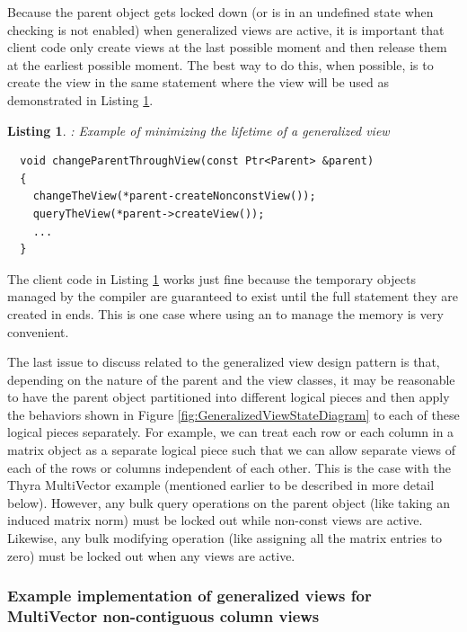 \documentclass[pdf,ps2pdf,11pt]{SANDreport}
\newtheorem{listing}{Listing}
\begin{document}
Because the parent object gets locked down (or is in an undefined
state when checking is not enabled) when generalized views are active,
it is important that client code only create views at the last
possible moment and then release them at the earliest possible moment.
The best way to do this, when possible, is to create the view in the
same statement where the view will be used as demonstrated in Listing
{}\ref{listing:generalized-view-min-lifetime}.


\begin{listing}:  Example of minimizing the lifetime of a generalized
view  \\
\label{listing:generalized-view-min-lifetime}
{\small\begin{verbatim}
  void changeParentThroughView(const Ptr<Parent> &parent)
  {
    changeTheView(*parent-createNonconstView());
    queryTheView(*parent->createView());
    ...
  }
\end{verbatim}}
\end{listing}


The client code in Listing
{}\ref{listing:generalized-view-min-lifetime} works just fine because
the temporary {} objects managed by the
compiler are guaranteed to exist until the full statement they are
created in ends.  This is one case where using an {} to
manage the memory is very convenient.

The last issue to discuss related to the generalized view design
pattern is that, depending on the nature of the parent and the view
classes, it may be reasonable to have the parent object partitioned
into different logical pieces and then apply the behaviors shown in
Figure {}\ref{fig:GeneralizedViewStateDiagram} to each of these
logical pieces separately.  For example, we can treat each row or each
column in a matrix object as a separate logical piece such that we can
allow separate views of each of the rows or columns independent of
each other.  This is the case with the Thyra MultiVector example
(mentioned earlier to be described in more detail below).  However,
any bulk query operations on the parent object (like taking an induced
matrix norm) must be locked out while non-const views are active.
Likewise, any bulk modifying operation (like assigning all the matrix
entries to zero) must be locked out when any views are active.


%
{}\subsubsection*{Example implementation of generalized views for
MultiVector non-contiguous column views}
%
\end{document}
